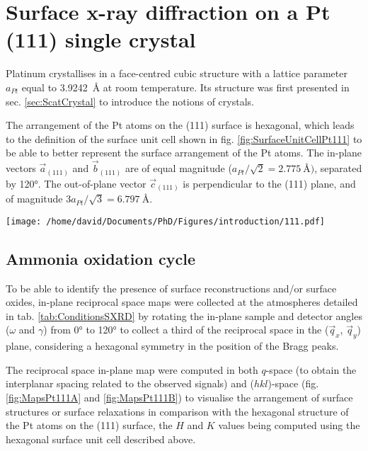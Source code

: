 \section{Surface x-ray diffraction on a Pt (111) single crystal} \label{sec:SXRD111}

Platinum crystallises in a face-centred cubic structure with a lattice parameter $a_{Pt}$ equal to \qty{3.9242}{\angstrom} at room temperature.
Its structure was first presented in sec. \ref{sec:ScatCrystal} to introduce the notions of crystals.

The arrangement of the Pt atoms on the (111) surface is hexagonal, which leads to the definition of the surface unit cell shown in fig. \ref{fig:SurfaceUnitCellPt111} to be able to better represent the surface arrangement of the Pt atoms.
The in-plane vectors $\vec{a}_{(111)}$ and $\vec{b}_{(111)}$ are of equal magnitude ($a_{Pt} / \sqrt{2} = \qty{2.775}{\angstrom})$, separated by \ang{120}.
The out-of-plane vector $\vec{c}_{(111)}$ is perpendicular to the (111) plane, and of magnitude $3 a_{Pt} / \sqrt{3} = \qty{6.797}{\angstrom}$.

\begin{SCfigure}
    \centering
    \texttt{[image: /home/david/Documents/PhD/Figures/introduction/111.pdf]}
    \caption{
        Face-centred cubic unit cell of Pt with (111) crystallographic plane drawn in green.
        $\vec{a}_{(111)}$, $\vec{b}_{(111)}$ and $\vec{c}_{(111)}$ are the $(111)$ surface unit cell vectors.
        There are three (111) planes spanned by the magnitude of $\vec{c}_{(111)}$ (blue, red and green on the figure).
    }
    \label{fig:SurfaceUnitCellPt111}
\end{SCfigure}

\subsection{Ammonia oxidation cycle}

To be able to identify the presence of surface reconstructions and/or surface oxides, in-plane reciprocal space maps were collected at the atmospheres detailed in tab. \ref{tab:ConditionsSXRD} by rotating the in-plane sample and detector angles ($\omega$ and $\gamma$) from \ang{0} to \ang{120} to collect a third of the reciprocal space in the ($\vec{q}_x$, $\vec{q}_y$) plane, considering a hexagonal symmetry in the position of the Bragg peaks.

The reciprocal space in-plane map were computed in both $q$-space (to obtain the interplanar spacing related to the observed signals) and ($hkl$)-space (fig. \ref{fig:MapsPt111A} and \ref{fig:MapsPt111B}) to visualise the arrangement of surface structures or surface relaxations in comparison with the hexagonal structure of the Pt atoms on the (111) surface, the $H$ and $K$ values being computed using the hexagonal surface unit cell described above.

